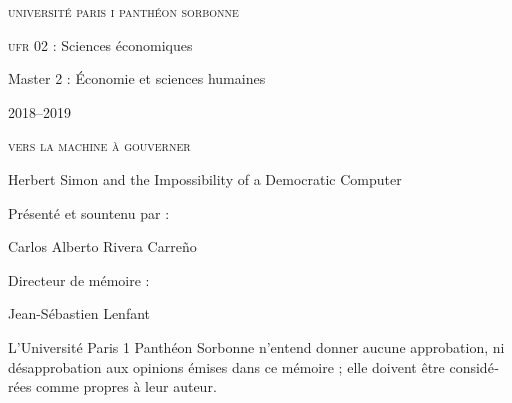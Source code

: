 \documentclass[version=last,draft=true,paper=A4,portrait,twoside=true,twocolumn=false,headinclude=false,footinclude=false,fontsize=12,BCOR=20mm,DIV=calc,pagesize=auto,titlepage=firstiscover,mpinclude=true,open=right,chapterprefix=true,numbers=autoendperiod,headsepline=false,parskip=false]{scrbook}
\author{Carlos Alberto Rivera Carreño}
\date{}
\title{}
\begin{document}


\begin{titlepage}
 \centering
\begin{french}
 {\large \textsc{université paris i panthéon sorbonne} \par}
  \vspace*{0.01\textheight}
 {\large \textsc{ufr} 02 : Sciences économiques  \par}
  \vspace*{0.01\textheight}
 {\large Master 2 : Économie et sciences humaines \par}
  \vspace*{0.01\textheight}
 {\large 2018--2019 \par}
\end{french}
  \vspace*{0.3\textheight}
 {\huge \textsc{vers la machine à gouverner}  \par}
  \vspace*{0.02\textheight}
 {\Large Herbert Simon and the Impossibility of a Democratic Computer \par}
\vfill
\begin{french}
 {\large Présenté et sountenu par : \par}
\end{french}
 {\Large Carlos Alberto Rivera Carreño \par}
  \vspace*{0.05\textheight}
\begin{french}
 {\large Directeur de mémoire : \par}
\end{french}
 {\Large Jean-Sébastien Lenfant \par}
\end{titlepage}

\pagestyle{empty}

\begin{french}
L'Université Paris 1 Panthéon Sorbonne n'entend donner aucune approbation,
ni désapprobation aux opinions émises dans ce mémoire ; elle doivent être
considérées comme propres à leur auteur. 
\end{french}
\vfill
\end{document}
